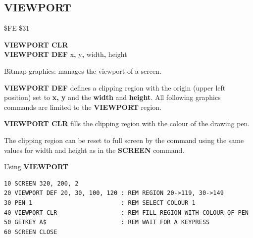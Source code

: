 \subsection{VIEWPORT}
\begin{description}[leftmargin=2cm,style=nextline]
\item [Token:]    \$FE \$31

\item [Format:]   {\bf VIEWPORT CLR} \\
            	   {\bf VIEWPORT DEF} x{\bf,} y{\bf,} width{\bf,} height

\item [Usage:]    Bitmap graphics: manages the viewport of a screen.

                  {\bf VIEWPORT DEF} defines a clipping region with the origin (upper left position) set to {\bf x, y} and the {\bf width} and {\bf height}. All following graphics commands are limited to the {\bf VIEWPORT} region.

                  {\bf VIEWPORT CLR} fills the clipping region with the colour of the drawing pen.

\item [Remarks:]  The clipping region can be reset to full screen by the command  using the same values for width and height as in the {\bf SCREEN} command.

\item [Example:]  Using {\bf VIEWPORT}

\begin{tcolorbox}[colback=black,coltext=white]
\verbatimfont{\codefont}
\begin{verbatim}
10 SCREEN 320, 200, 2
20 VIEWPORT DEF 20, 30, 100, 120 : REM REGION 20->119, 30->149
30 PEN 1                         : REM SELECT COLOUR 1
40 VIEWPORT CLR                  : REM FILL REGION WITH COLOUR OF PEN
50 GETKEY A$                     : REM WAIT FOR A KEYPRESS
60 SCREEN CLOSE
\end{verbatim}
\end{tcolorbox}
\end{description}


\newpage
